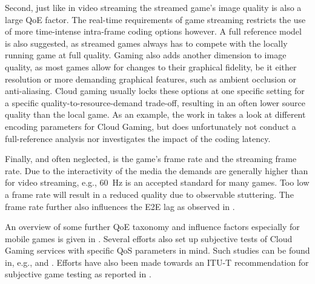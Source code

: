 Second, just like in video streaming the streamed game's image quality is also a large \gls{QoE} factor. The real-time requirements of game streaming restricts the use of more time-intense intra-frame coding options however. A full reference model is also suggested, as streamed games always has to compete with the locally running game at full quality. Gaming also adds another dimension to image quality, as most games allow for changes to their graphical fidelity, be it either resolution or more demanding graphical features, such as ambient occlusion or anti-aliasing. Cloud gaming usually locks these options at one specific setting for a specific quality-to-resource-demand trade-off, resulting in an often lower source quality than the local game. As an example, the work in \cite{slivarimpact} takes a look at different encoding parameters for Cloud Gaming, but does unfortunately not conduct a full-reference analysis nor investigates the impact of the coding latency.

Finally, and often neglected, is the game's frame rate and the streaming frame rate. Due to the interactivity of the media the demands are generally higher than for video streaming, e.g., \SI{60}{\hertz} is an accepted standard for many games. Too low a frame rate will result in a reduced quality due to observable stuttering. The frame rate further also influences the \gls{E2E} lag as observed in \cite{metzger16lagmodel}.

An overview of some further \gls{QoE} taxonomy and influence factors especially for mobile games is given in \cite{beyer2014typedisplaydelayimpact}. Several efforts also set up subjective tests of Cloud Gaming services with specific \gls{QoS} parameters in mind. Such studies can be found in, e.g., \cite{Jarschel20132883} and  \cite{6614351}. Efforts have also been made towards an \acrshort{ITU-T} recommendation for subjective game testing as reported in \cite{mollertowards}.








